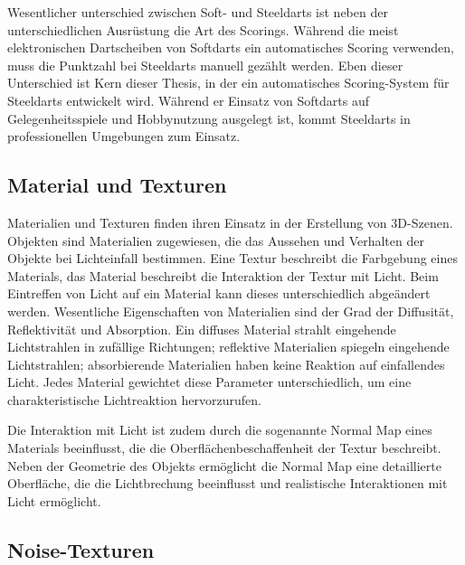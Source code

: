 Wesentlicher unterschied zwischen Soft- und Steeldarts ist neben der unterschiedlichen Ausrüstung die Art des Scorings. Während die meist elektronischen Dartscheiben von Softdarts ein automatisches Scoring verwenden, muss die Punktzahl bei Steeldarts manuell gezählt werden. Eben dieser Unterschied ist Kern dieser Thesis, in der ein automatisches Scoring-System für Steeldarts entwickelt wird. Während er Einsatz von Softdarts auf Gelegenheitsspiele und Hobbynutzung ausgelegt ist, kommt Steeldarts in professionellen Umgebungen zum Einsatz.


\subsection{Material und Texturen}  %
\label{sec:material_texturen}

Materialien und Texturen finden ihren Einsatz in der Erstellung von 3D-Szenen. Objekten sind Materialien zugewiesen, die das Aussehen und Verhalten der Objekte bei Lichteinfall bestimmen. Eine Textur beschreibt die Farbgebung eines Materials, das Material beschreibt die Interaktion der Textur mit Licht. Beim Eintreffen von Licht auf ein Material kann dieses unterschiedlich abgeändert werden. Wesentliche Eigenschaften von Materialien sind der Grad der Diffusität, Reflektivität und Absorption. Ein diffuses Material strahlt eingehende Lichtstrahlen in zufällige Richtungen; reflektive Materialien spiegeln eingehende Lichtstrahlen; absorbierende Materialien haben keine Reaktion auf einfallendes Licht. Jedes Material gewichtet diese Parameter unterschiedlich, um eine charakteristische Lichtreaktion hervorzurufen.

Die Interaktion mit Licht ist zudem durch die sogenannte Normal Map eines Materials beeinflusst, die die Oberflächenbeschaffenheit der Textur beschreibt. Neben der Geometrie des Objekts ermöglicht die Normal Map eine detaillierte Oberfläche, die die Lichtbrechung beeinflusst und realistische Interaktionen mit Licht ermöglicht.


\subsection{Noise-Texturen}
\label{sec:noise}

